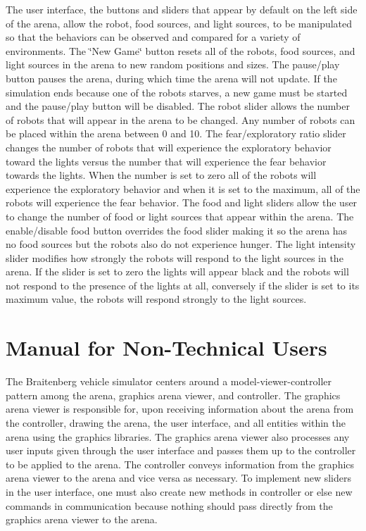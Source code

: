 The user interface, the buttons and sliders that appear by default on the left side of the arena, allow the robot, food sources, and light sources, to be manipulated so that the behaviors can be observed and compared for a variety of environments. The \char`\"{}\+New Game\char`\"{} button resets all of the robots, food sources, and light sources in the arena to new random positions and sizes. The pause/play button pauses the arena, during which time the arena will not update. If the simulation ends because one of the robots starves, a new game must be started and the pause/play button will be disabled. The robot slider allows the number of robots that will appear in the arena to be changed. Any number of robots can be placed within the arena between 0 and 10. The fear/exploratory ratio slider changes the number of robots that will experience the exploratory behavior toward the lights versus the number that will experience the fear behavior towards the lights. When the number is set to zero all of the robots will experience the exploratory behavior and when it is set to the maximum, all of the robots will experience the fear behavior. The food and light sliders allow the user to change the number of food or light sources that appear within the arena. The enable/disable food button overrides the food slider making it so the arena has no food sources but the robots also do not experience hunger. The light intensity slider modifies how strongly the robots will respond to the light sources in the arena. If the slider is set to zero the lights will appear black and the robots will not respond to the presence of the lights at all, conversely if the slider is set to its maximum value, the robots will respond strongly to the light sources. \hypertarget{index_User}{}\section{Manual for Non-\/\+Technical Users}\label{index_User}
The Braitenberg vehicle simulator centers around a model-\/viewer-\/controller pattern among the arena, graphics arena viewer, and controller. The graphics arena viewer is responsible for, upon receiving information about the arena from the controller, drawing the arena, the user interface, and all entities within the arena using the graphics libraries. The graphics arena viewer also processes any user inputs given through the user interface and passes them up to the controller to be applied to the arena. The controller conveys information from the graphics arena viewer to the arena and vice versa as necessary. To implement new sliders in the user interface, one must also create new methods in controller or else new commands in communication because nothing should pass directly from the graphics arena viewer to the arena.

